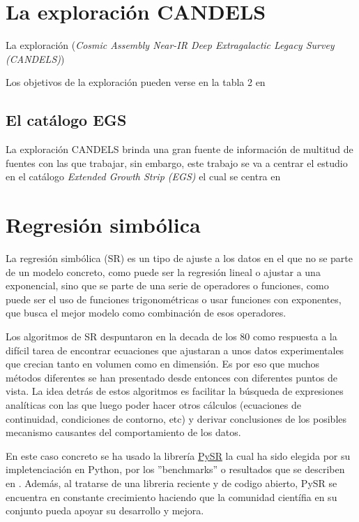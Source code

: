 \documentclass[11pt, a4paper]{article} %
\begin{document}
\section{La exploración CANDELS}

La exploración (\textit{Cosmic Assembly Near-IR Deep Extragalactic Legacy Survey (CANDELS)})\autocite{Grogin,Koekemoer}



Los objetivos de la exploración pueden verse en la tabla 2 en \autocite{Grogin}

\subsection{El catálogo EGS}

La exploración CANDELS brinda una gran fuente de información de multitud de fuentes con las que trabajar, sin embargo, este
trabajo se va a centrar el estudio en el catálogo \textit{Extended Growth Strip (EGS)} el cual se centra en 

\autocite{Stefanon,Kodra_2023}
\section{Regresión simbólica}

La regresión simbólica (SR) es un tipo de ajuste a los datos en el que no se parte de un 
modelo concreto, como puede ser la regresión lineal o ajustar a una exponencial, sino que 
se parte de una serie de operadores o funciones, como puede ser el uso de funciones trigonométricas 
o usar funciones con exponentes, que busca el mejor modelo como combinación de esos operadores.  


Los algoritmos de SR despuntaron en la decada de los 80 como respuesta a la difícil tarea de encontrar ecuaciones que 
ajustaran a unos datos experimentales que crecian tanto en volumen como en dimensión. Es por eso que muchos métodos diferentes
se han presentado desde entonces con diferentes puntos de vista. La idea detrás de estos algoritmos es facilitar la búsqueda
de expresiones analíticas con las que luego poder hacer otros cálculos (ecuaciones de continuidad, condiciones de contorno, etc)
y derivar conclusiones de los posibles mecanismo causantes del comportamiento de los datos. 


En este caso concreto se ha usado la librería \href{https://github.com/MilesCranmer/PySR}{PySR} la cual
ha sido elegida por su impletenciación en Python, por los ''benchmarks''  o resultados que 
se describen en \autocite{cranmerInterpretableMachineLearning2023}. Además, al tratarse de una libreria reciente y de codigo abierto,
PySR se encuentra en constante crecimiento haciendo que la comunidad científia en su conjunto pueda apoyar su desarrollo y mejora.
\end{document}
